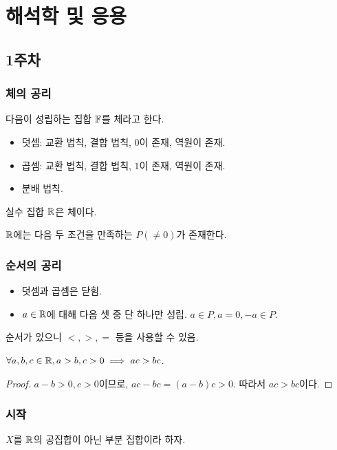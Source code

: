 \chapter{해석학 및 응용}


\section{1주차}

\subsection{체의 공리}

다음이 성립하는 집합 $\mathbb{F}$를 체라고 한다.
\begin{itemize}
  \item 덧셈: 교환 법칙, 결합 법칙, $0$이 존재, 역원이 존재.
  \item 곱셈: 교환 법칙, 결합 법칙, $1$이 존재, 역원이 존재.
  \item 분배 법칙.
\end{itemize}
실수 집합 $\mathbb{R}$은 체이다.

$\mathbb{R}$에는 다음 두 조건을 만족하는 $P(\neq 0)$가 존재한다.
\subsection{순서의 공리}
\begin{itemize}
  \item 덧셈과 곱셈은 닫힘.
  \item $a \in \mathbb{R}$에 대해 다음 셋 중 단 하나만 성립. $a \in P, a = 0, -a \in P$.
\end{itemize}
순서가 있으니 $<, >, =$ 등을 사용할 수 있음.

\begin{theorem}
  \label{thm:acbc}
  $\forall a, b, c \in \mathbb{R}, a > b, c > 0 \implies ac > bc$.
\end{theorem}

\begin{proof}
    $a - b > 0, c > 0$이므로, $ac - bc = (a-b)c > 0$. 따라서 $ac > bc$이다.
\end{proof}

\subsection{시작}
$X$를 $\mathbb{R}$의 공집합이 아닌 부분 집합이라 하자. 

